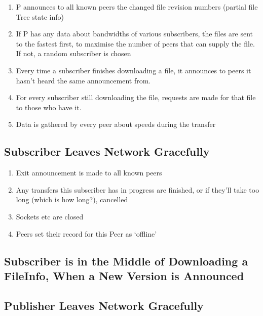 \documentclass[12pt,a4paper,]{adreport}
\begin{document}
\begin{enumerate}
\def\labelenumi{\arabic{enumi}.}
\itemsep1pt\parskip0pt
\item
  P announces to all known peers the changed file revision numbers
  (partial file Tree state info)
\item
  If P has any data about bandwidths of various subscribers, the files
  are sent to the fastest first, to maximise the number of peers that
  can supply the file. If not, a random subscriber is chosen
\item
  Every time a subscriber finishes downloading a file, it announces to
  peers it hasn't heard the same announcement from.
\item
  For every subscriber still downloading the file, requests are made for
  that file to those who have it.
\item
  Data is gathered by every peer about speeds during the transfer
\end{enumerate}

\subsection{Subscriber Leaves Network
Gracefully}\label{subscriber-leaves-network-gracefully}

\begin{enumerate}
\def\labelenumi{\arabic{enumi}.}
\itemsep1pt\parskip0pt
\item
  Exit announcement is made to all known peers
\item
  Any transfers this subscriber has in progress are finished, or if
  they'll take too long (which is how long?), cancelled
\item
  Sockets etc are closed
\item
  Peers set their record for this Peer as `offline'
\end{enumerate}

\subsection{Subscriber is in the Middle of Downloading a FileInfo, When
a New Version is
Announced}\label{subscriber-is-in-the-middle-of-downloading-a-fileinfo-when-a-new-version-is-announced}

\subsection{Publisher Leaves Network
Gracefully}\label{publisher-leaves-network-gracefully}
\end{document}
